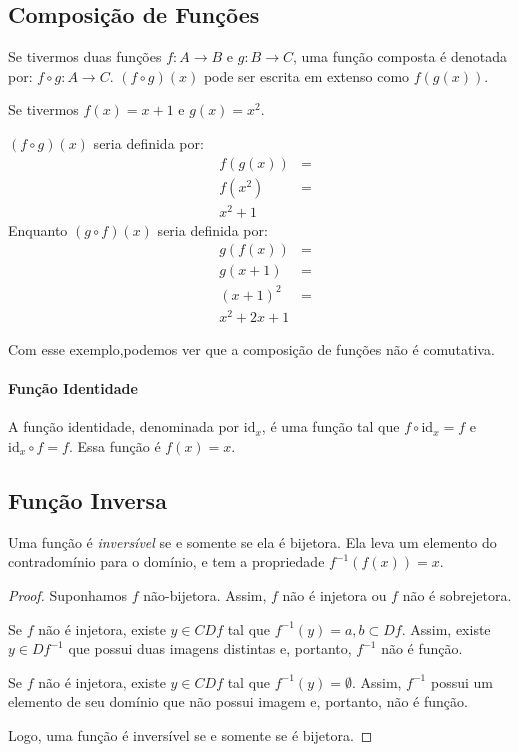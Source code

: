 \subsection{Composição de Funções}
Se tivermos duas funções $f: A \rightarrow B$ e $g: B \rightarrow C$, uma função composta é denotada por: $f \circ g: A \rightarrow C$. $(f \circ g)(x)$ pode ser escrita em extenso como $f(g(x))$.\\
\begin{exemplo}
Se tivermos $f(x)=x+1$ e $g(x)=x^2$.\par 
$(f \circ g)(x)$ seria definida por:
\begin{align*}
&f(g(x)) &= \\
&f(x^2) &=\\
&x^2+1
\end{align*}
Enquanto $(g \circ f)(x)$ seria definida por:
\begin{align*}
&g(f(x)) &= \\
&g(x+1) &=\\
&(x+1)^2 &=\\
&x^2+2x+1
\end{align*}
\end{exemplo}
Com esse exemplo,podemos ver que a composição de funções não é comutativa.

\paragraph{Função Identidade} A função identidade, denominada por $\textrm{id}_x$, é uma função tal que $f \circ \textrm{id}_x=f$ e $\textrm{id}_x \circ f = f$. Essa função é $f(x)=x$.

\subsection{Função Inversa}
Uma função é \emph{inversível} se e somente se ela é bijetora. Ela leva um elemento do contradomínio para o domínio, e tem a propriedade $f^{-1}(f(x))=x$.
\begin{proof}
Suponhamos $f$ não-bijetora. Assim, $f$ não é injetora ou $f$ não é sobrejetora.\par 
Se $f$ não é injetora, existe $y \in CD f$ tal que $f^{-1}(y)={a,b} \subset D f$. Assim, existe $y \in D f^{-1}$ que possui duas imagens distintas e, portanto, $f^{-1}$ não é função.\par 
Se $f$ não é injetora, existe $y \in CD f$ tal que $f^{-1}(y)=\emptyset$. Assim, $f^{-1}$ possui um elemento de seu domínio que não possui imagem e, portanto, não é função.\par 
Logo, uma função é inversível se e somente se é bijetora.
\end{proof}

